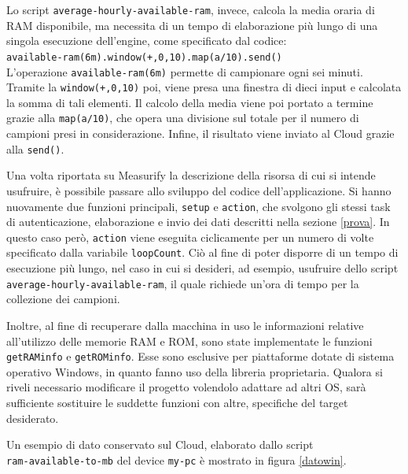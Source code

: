 Lo script \texttt{average-hourly-available-ram}, invece, calcola la media oraria di RAM disponibile, ma necessita di un tempo di elaborazione più lungo di una singola esecuzione dell'engine, come specificato dal codice:\\ \texttt{available-ram(6m).window(+,0,10).map(a/10).send()}\\ L’operazione \texttt{available-ram(6m)} permette di campionare ogni sei minuti. Tramite la \texttt{window(+,0,10)} poi, viene presa una finestra di dieci input e calcolata la somma di tali elementi. Il calcolo della media viene poi portato a termine grazie alla \texttt{map(a/10)}, che opera una divisione sul totale per il numero di campioni presi in considerazione. Infine, il risultato viene inviato al Cloud grazie alla \texttt{send()}.

Una volta riportata su Measurify la descrizione della risorsa di cui si intende usufruire, è possibile passare allo sviluppo del codice dell'applicazione. Si hanno nuovamente due funzioni principali, \texttt{setup} e \texttt{action}, che svolgono gli stessi task di autenticazione, elaborazione e invio dei dati descritti nella sezione \ref{prova}. In questo caso però, \texttt{action} viene eseguita ciclicamente per un numero di volte specificato dalla variabile \texttt{loopCount}. Ciò al fine di poter disporre di un tempo di esecuzione più lungo, nel caso in cui si desideri, ad esempio, usufruire dello script \texttt{average-hourly-available-ram}, il quale richiede un'ora di tempo per la collezione dei campioni.

Inoltre, al fine di recuperare dalla macchina in uso le informazioni relative all'utilizzo delle memorie RAM e ROM, sono state implementate le funzioni \texttt{getRAMinfo} e  \texttt{getROMinfo}. Esse sono esclusive per piattaforme dotate di sistema operativo Windows, in quanto fanno uso della libreria proprietaria. Qualora si riveli necessario modificare il progetto volendolo adattare ad altri OS, sarà sufficiente sostituire le suddette funzioni con altre, specifiche del target desiderato.

Un esempio di dato conservato sul Cloud, elaborato dallo script \\\texttt{ram-available-to-mb} del device \texttt{my-pc} è mostrato in figura \ref{datowin}.

